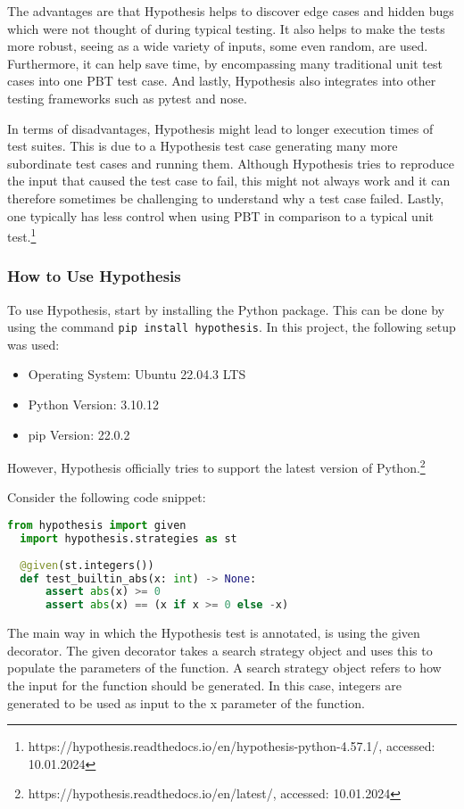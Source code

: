 \documentclass[runningheads]{llncs}
\begin{document}
The advantages are that Hypothesis helps to discover edge cases and hidden bugs which were not thought of during typical testing. It also helps to make the tests more robust, seeing as a wide variety of inputs, some even random, are used.
Furthermore, it can help save time, by encompassing many traditional unit test cases into one PBT test case. And lastly, Hypothesis also integrates into other testing frameworks such as pytest and nose.

In terms of disadvantages, Hypothesis might lead to longer execution times of test suites. This is due to a Hypothesis test case generating many more subordinate test cases and running them. Although Hypothesis tries to reproduce the input that caused the test case to fail, this might not always work and it can therefore sometimes be challenging to understand why a test case failed.
Lastly, one typically has less control when using PBT in comparison to a typical unit test.\footnote{https://hypothesis.readthedocs.io/en/hypothesis-python-4.57.1/, accessed: 10.01.2024}

\subsubsection{How to Use Hypothesis}
To use Hypothesis, start by installing the Python package. This can be done by using the command \texttt{pip install hypothesis}. In this project, the following setup was used:

\begin{itemize}
  \item Operating System: Ubuntu 22.04.3 LTS
  \item Python Version: 3.10.12
  \item pip Version: 22.0.2
\end{itemize}

However, Hypothesis officially tries to support the latest version of Python.\footnote{https://hypothesis.readthedocs.io/en/latest/, accessed: 10.01.2024}

Consider the following code snippet:
\begin{lstlisting}[language=Python]
  from hypothesis import given
  import hypothesis.strategies as st
  
  @given(st.integers())
  def test_builtin_abs(x: int) -> None:
      assert abs(x) >= 0
      assert abs(x) == (x if x >= 0 else -x)
\end{lstlisting}

The main way in which the Hypothesis test is annotated, is using the given decorator. The given decorator takes a search strategy object and uses this to populate the parameters of the function. A search strategy object refers to how the input for the function should be generated. In this case, integers are generated to be used as input to the x parameter of the function.
\end{document}
